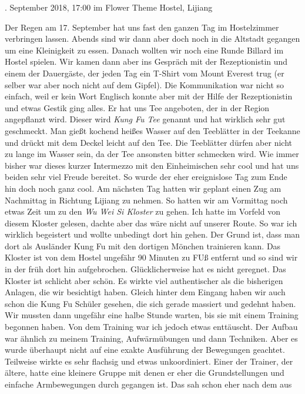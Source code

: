 \documentclass[11pt]{book}
\begin{document}
. September 2018, 17:00 im Flower Theme Hostel, Lijiang

Der Regen am 17. September hat uns fast den ganzen Tag im Hostelzimmer verbringen lassen. Abends sind wir dann aber 
doch noch in die Altstadt gegangen um eine Kleinigkeit zu essen. Danach wollten wir noch eine Runde Billard 
im Hostel spielen. Wir kamen dann aber ins Gespräch mit der Rezeptionistin und einem der Dauergäste, der jeden 
Tag ein T-Shirt vom Mount Everest trug (er selber war aber noch nicht auf dem Gipfel). Die Kommunikation war 
nicht so einfach, weil er kein Wort Englisch konnte aber mit der Hilfe der Rezeptionistin und etwas Gestik ging alles.
Er hat uns Tee angeboten, der in der Region angepflanzt wird. Dieser wird \emph{Kung Fu Tee} genannt und hat wirklich 
sehr gut geschmeckt. Man gießt kochend heißes Wasser auf den Teeblätter in der Teekanne und drückt mit dem Deckel 
leicht auf den Tee. Die Teeblätter dürfen aber nicht zu lange im Wasser sein, da der Tee ansonsten bitter schmecken 
wird. Wie immer bisher war dieses kurzer Intermezzo mit den Einheimischen sehr cool und hat uns beiden sehr viel 
Freude bereitet. So wurde der eher ereignislose Tag zum Ende hin doch noch ganz cool.
Am nächsten Tag hatten wir geplant einen Zug am Nachmittag in Richtung Lijiang zu nehmen. So hatten wir am Vormittag 
noch etwas Zeit um zu den \emph{Wu Wei Si Kloster} zu gehen. Ich hatte im Vorfeld von diesem Kloster gelesen, dachte 
aber das wäre nicht auf unserer Route. So war ich wirklich begeistert und wollte unbedingt dort hin gehen. Der Grund ist, 
dass man dort als Ausländer Kung Fu mit den dortigen Mönchen trainieren kann. Das Kloster ist von dem Hostel 
ungefähr 90 Minuten zu FUß entfernt und so sind wir in der früh dort hin aufgebrochen. Glücklicherweise hat es nicht 
geregnet. Das Kloster ist schlicht aber schön. Es wirkte viel authentischer als die bisherigen Anlagen, die wir 
besichtigt haben. Gleich hinter dem Eingang haben wir auch schon die Kung Fu Schüler gesehen, die sich gerade 
massiert und gedehnt haben. Wir mussten dann ungefähr eine halbe Stunde warten, bis sie mit einem Training begonnen 
haben. Von dem Training war ich jedoch etwas enttäuscht. Der Aufbau war ähnlich zu meinem Training, Aufwärmübungen 
und dann Techniken. Aber es wurde überhaupt nicht auf eine exakte Ausführung der Bewegungen geachtet. Teilweise 
wirkte es sehr flachsig und etwas unkoordiniert. Einer der Trainer, der ältere, hatte eine kleinere Gruppe mit 
denen er eher die Grundstellungen und einfache Armbewegungen durch gegangen ist. Das sah schon eher nach dem aus 
\end{document}
